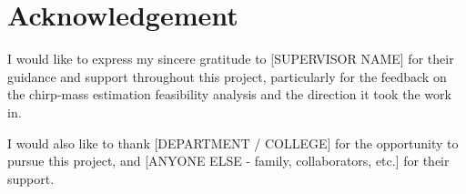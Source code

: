 \chapter*{Acknowledgement}

I would like to express my sincere gratitude to [SUPERVISOR NAME] for their guidance and support throughout this project, particularly for the feedback on the chirp-mass estimation feasibility analysis and the direction it took the work in. %

I would also like to thank [DEPARTMENT / COLLEGE] for the opportunity to pursue this project, and [ANYONE ELSE - family, collaborators, etc.] for their support. %
